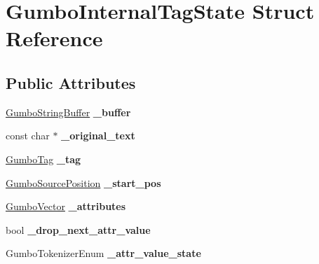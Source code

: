 \hypertarget{struct_gumbo_internal_tag_state}{}\section{Gumbo\+Internal\+Tag\+State Struct Reference}
\label{struct_gumbo_internal_tag_state}
\subsection*{Public Attributes}
\begin{DoxyCompactItemize}
\item 
\mbox{\label{struct_gumbo_internal_tag_state_a83a90b97950c9dae49200189ea89bd46}} 
\mbox{\hyperlink{struct_gumbo_string_buffer}{Gumbo\+String\+Buffer}} {\bfseries \+\_\+buffer}
\item 
\mbox{\label{struct_gumbo_internal_tag_state_ad12b8d64f7508ec7ab4f57b40cf612ab}} 
const char $\ast$ {\bfseries \+\_\+original\+\_\+text}
\item 
\mbox{\label{struct_gumbo_internal_tag_state_a3e6f47f5246dbe89d6a57d8e3c9e2223}} 
\mbox{\hyperlink{gumbo_8h_a5a3aa6f4b039f85875d638088e676a0f}{Gumbo\+Tag}} {\bfseries \+\_\+tag}
\item 
\mbox{\label{struct_gumbo_internal_tag_state_a86bfadf1624906240b236bbb7c67af17}} 
\mbox{\hyperlink{struct_gumbo_source_position}{Gumbo\+Source\+Position}} {\bfseries \+\_\+start\+\_\+pos}
\item 
\mbox{\label{struct_gumbo_internal_tag_state_a42e017da6b736d1cc82c864ef9876500}} 
\mbox{\hyperlink{struct_gumbo_vector}{Gumbo\+Vector}} {\bfseries \+\_\+attributes}
\item 
\mbox{\label{struct_gumbo_internal_tag_state_aaf8ae81b1b4d66995d24fb3ae21f22f1}} 
bool {\bfseries \+\_\+drop\+\_\+next\+\_\+attr\+\_\+value}
\item 
\mbox{\label{struct_gumbo_internal_tag_state_af743a2ba4694873117b07095eda373ee}} 
Gumbo\+Tokenizer\+Enum {\bfseries \+\_\+attr\+\_\+value\+\_\+state}

\end{DoxyCompactItemize}
